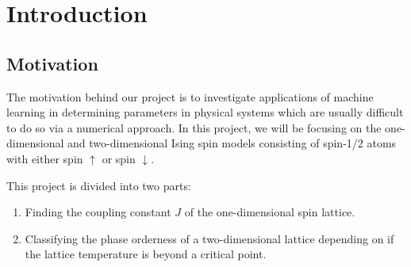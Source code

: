 \section{Introduction}

\subsection{Motivation}

The motivation behind our project is to investigate applications of machine learning in determining parameters in physical systems which are usually difficult to do so via a numerical approach.
In this project, we will be focusing on the one-dimensional and two-dimensional Ising spin models consisting of spin-1/2 atoms with either spin \( \uparrow \) or spin \( \downarrow \).

This project is divided into two parts:

\begin{enumerate}
    \item Finding the coupling constant \( J \) of the one-dimensional spin lattice.
    \item Classifying the phase orderness of a two-dimensional lattice depending on if the lattice temperature is beyond a critical point.
\end{enumerate}

